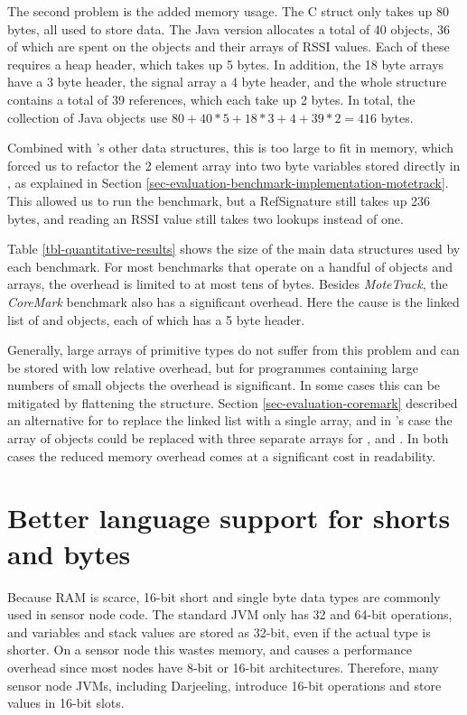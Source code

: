 The second problem is the added memory usage. The C struct only takes up 80 bytes, all used to store data. The Java version allocates a total of 40 objects, 36 of which are spent on the  objects and their arrays of RSSI values. Each of these requires a heap header, which takes up 5 bytes. In addition, the 18 byte arrays have a 3 byte header, the signal array a 4 byte header, and the whole structure contains a total of 39 references, which each take up 2 bytes. In total, the collection of Java objects use $80 + 40*5 + 18*3 + 4 + 39*2 = 416$ bytes.

Combined with 's other data structures, this is too large to fit in memory, which forced us to refactor the 2 element  array into two byte variables stored directly in , as explained in Section \ref{sec-evaluation-benchmark-implementation-motetrack}. This allowed us to run the benchmark, but a RefSignature still takes up 236 bytes, and reading an RSSI value still takes two lookups instead of one.

Table \ref{tbl-quantitative-results} shows the size of the main data structures used by each benchmark. For most benchmarks that operate on a handful of objects and arrays, the overhead is limited to at most tens of bytes. Besides \emph{MoteTrack}, the \emph{CoreMark} benchmark also has a significant overhead. Here the cause is the linked list of  and  objects, each of which has a 5 byte header.

Generally, large arrays of primitive types do not suffer from this problem and can be stored with low relative overhead, but for programmes containing large numbers of small objects the overhead is significant. In some cases this can be mitigated by flattening the structure. Section \ref{sec-evaluation-coremark} described an alternative for  to replace the linked list with a single array, and in 's case the array of  objects could be replaced with three separate arrays for ,  and . In both cases the reduced memory overhead comes at a significant cost in readability.




\section{Better language support for shorts and bytes}
\label{sec-small-datatypes}
Because RAM is scarce, 16-bit short and single byte data types are commonly used in sensor node code. The standard JVM only has 32 and 64-bit operations, and variables and stack values are stored as 32-bit, even if the actual type is shorter. On a sensor node this wastes memory, and causes a performance overhead since most nodes have 8-bit or 16-bit architectures. Therefore, many sensor node JVMs, including Darjeeling, introduce 16-bit operations and store values in 16-bit slots.

